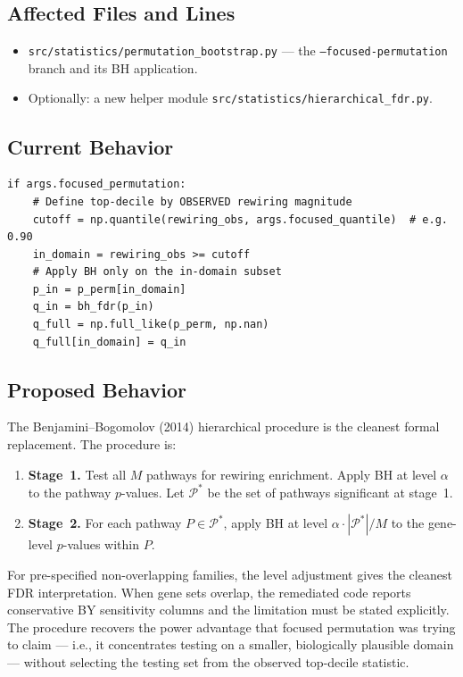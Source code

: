 \documentclass[11pt]{article}
\newcommand{\code}[1]{\texttt{#1}}
\begin{document}
\subsection{Affected Files and Lines}

\begin{itemize}[leftmargin=*]
\item \code{src/statistics/permutation\_bootstrap.py} --- the \code{--focused-permutation} branch and its BH application.
\item Optionally: a new helper module \code{src/statistics/hierarchical\_fdr.py}.
\end{itemize}

\subsection{Current Behavior}

\begin{lstlisting}[style=pythonstyle,caption={Current focused-permutation BH (representative excerpt).}]
if args.focused_permutation:
    # Define top-decile by OBSERVED rewiring magnitude
    cutoff = np.quantile(rewiring_obs, args.focused_quantile)  # e.g. 0.90
    in_domain = rewiring_obs >= cutoff
    # Apply BH only on the in-domain subset
    p_in = p_perm[in_domain]
    q_in = bh_fdr(p_in)
    q_full = np.full_like(p_perm, np.nan)
    q_full[in_domain] = q_in
\end{lstlisting}

\subsection{Proposed Behavior}

The Benjamini--Bogomolov (2014) hierarchical procedure is the cleanest formal replacement. The procedure is:

\begin{enumerate}[leftmargin=*]
\item \textbf{Stage~1.} Test all $M$ pathways for rewiring enrichment. Apply BH at level $\alpha$ to the pathway $p$-values. Let $\mathcal{P}^*$ be the set of pathways significant at stage~1.
\item \textbf{Stage~2.} For each pathway $P\in\mathcal{P}^*$, apply BH at level $\alpha\cdot |\mathcal{P}^*|/M$ to the gene-level $p$-values within $P$.
\end{enumerate}

For pre-specified non-overlapping families, the level adjustment gives the cleanest FDR interpretation. When gene sets overlap, the remediated code reports conservative BY sensitivity columns and the limitation must be stated explicitly. The procedure recovers the power advantage that focused permutation was trying to claim --- i.e., it concentrates testing on a smaller, biologically plausible domain --- without selecting the testing set from the observed top-decile statistic.
\end{document}
